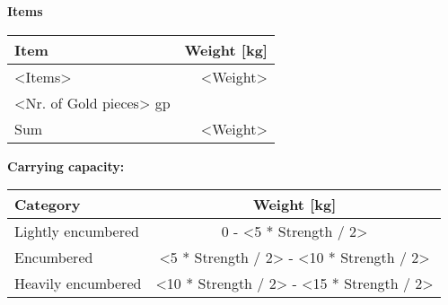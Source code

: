 \documentclass[11pt]{article}
\begin{document}
\clearpage

	\begin{center}
{\LARGE \textbf{Items}}
	\end{center}

	\begin{tabularx}{\textwidth}{X|r}
Item & Weight [kg] \\
\hline
<Items> \dotfill 							& <Weight> 	\\
<Nr. of Gold pieces> gp 					& 			\\
\hline
Sum 										& <Weight>
	\end{tabularx}

\vspace{10mm}

\textbf{Carrying capacity:} \\

	\begin{tabular}{l|c}
Category & Weight [kg] \\
\hline
Lightly encumbered 	& 0 - <5 * Strength / 2> 	\\
Encumbered 			& <5 * Strength / 2> - <10 * Strength / 2> \\
Heavily encumbered	& <10 * Strength / 2> - <15 * Strength / 2>
	\end{tabular}
\end{document}
